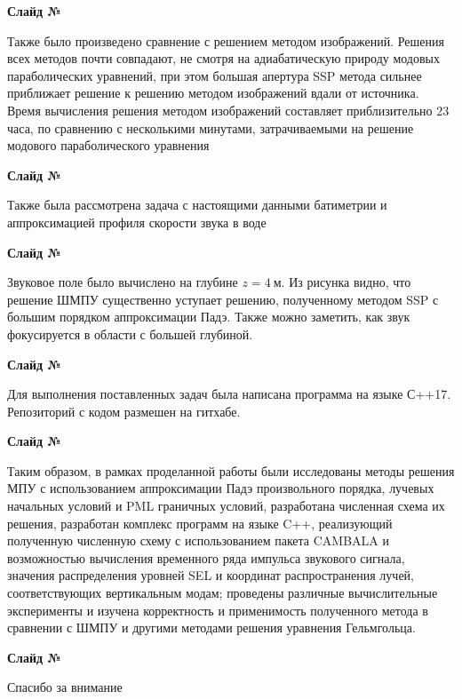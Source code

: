 \documentclass{fefu}
\newcounter{slide}
\newcommand{\slide}{\stepcounter{slide}\par\noindent\textbf{Слайд №\theslide}\par\noindent}
\begin{document}
    \slide
    Также было произведено сравнение с решением методом изображений. Решения всех методов почти совпадают, не смотря на адиабатическую природу модовых параболических уравнений, при этом большая апертура SSP метода сильнее приближает решение к решению методом изображений вдали от источника. Время вычисления решения методом изображений составляет приблизительно 23 часа, по сравнению с несколькими минутами, затрачиваемыми на решение модового параболического уравнения
    \slide
    Также была рассмотрена задача с настоящими данными батиметрии и аппроксимацией профиля скорости звука в воде
    \slide
    Звуковое поле было вычислено на глубине $z=4\ \text{м.}$ Из рисунка видно, что решение ШМПУ существенно уступает решению, полученному методом SSP с большим порядком аппроксимации Падэ. Также можно заметить, как звук фокусируется в области с большей глубиной.
    \slide
    Для выполнения поставленных задач была написана программа на языке С++17. Репозиторий с кодом размешен на гитхабе.
    \slide
    Таким образом, в рамках проделанной работы были исследованы методы решения МПУ с использованием аппроксимации Падэ произвольного порядка, лучевых начальных условий и PML граничных условий, разработана численная схема их решения, разработан комплекс программ на языке C++, реализующий полученную численную схему с использованием пакета CAMBALA и возможностью вычисления временного ряда импульса звукового сигнала, значения распределения уровней SEL и координат распространения лучей, соответствующих вертикальным модам; проведены различные вычислительные эксперименты и изучена корректность и применимость полученного метода в сравнении с ШМПУ и другими методами решения уравнения Гельмгольца.
    \slide
    Спасибо за внимание
\end{document}
